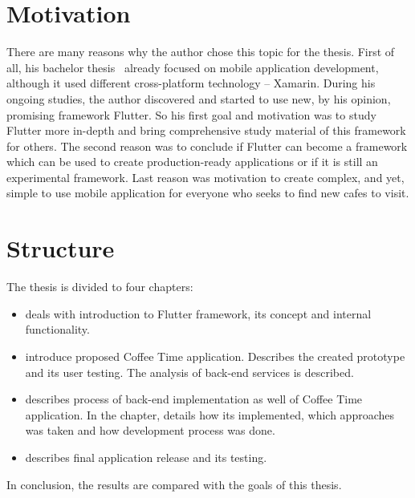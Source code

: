 \begin{introduction}
\section{Motivation}
There are many reasons why the author chose this topic for the thesis. First of all, his bachelor thesis~\cite{nymsap-bp} already focused on mobile application development, although it used different cross-platform technology -- Xamarin. During his ongoing studies, the author discovered and started to use new, by his opinion, promising framework Flutter. So his first goal and motivation was to study Flutter more in-depth and bring comprehensive study material of this framework for others. The second reason was to conclude if Flutter can become a framework which can be used to create production-ready applications or if it is still an experimental framework. Last reason was motivation to create complex, and yet, simple to use mobile application for everyone who seeks to find new cafes to visit.

\section{Structure}
The thesis is divided to four chapters:
\begin{itemize}
\item {} deals with introduction to Flutter framework, its concept and internal functionality.
\item {} introduce proposed Coffee Time application. Describes the created prototype and its user testing. The analysis of back-end services is described. 
\item {} describes process of back-end implementation as well of Coffee Time application. In the chapter, details how its implemented, which approaches was taken and how development process was done. 
\item {} describes final application release and its testing. 
\end{itemize}
In conclusion, the results are compared with the goals of this thesis. 
\end{introduction}